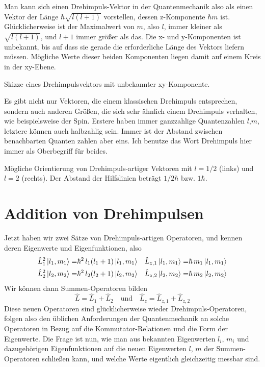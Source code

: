 Man kann sich einen Drehimpuls-Vektor in der Quantenmechanik also als einen Vektor der Länge $\hbar \sqrt{l (l+1)}$ vorstellen, dessen z-Komponente $\hbar m$ ist. Glücklicherweise ist der Maximalwert von $m$, also $l$, immer kleiner als $\sqrt{l (l+1)}$, und $l+1$ immer größer als das.
Die x- und y-Komponenten ist unbekannt, bis auf dass sie gerade die erforderliche Länge des Vektors liefern müssen. Mögliche Werte dieser beiden Komponenten liegen damit auf einem Kreis in der xy-Ebene.

\begin{marginfigure}
\caption{Skizze eines Drehimpulsvektors mit unbekannter xy-Komponente.}
\end{marginfigure}

Es gibt nicht nur Vektoren, die einem klassischen Drehimpuls entsprechen, sondern auch anderen Größen, die sich sehr ähnlich einem Drehimpuls verhalten, wie beispielsweise der Spin. Erstere haben immer ganzzahlige Quantenzahlen $l$,$m$, letztere können auch halbzahlig sein. Immer ist der Abstand zwischen benachbarten Quanten zahlen aber eins. Ich benutze das Wort Drehimpuls hier immer als Oberbegriff für beides.

\begin{marginfigure}

\caption{Mögliche Orientierung von  Drehimpuls-artiger Vektoren mit $l=1/2$ (links) und $l=2$ (rechts). Der Abstand der Hilfslinien beträgt $1/2 \hbar$ bzw. $1\hbar$.}
\end{marginfigure}

\section{Addition von Drehimpulsen}


Jetzt haben wir zwei Sätze von Drehimpuls-artigen Operatoren, und kennen deren Eigenwerte und Eigenfunktionen, also
\begin{align}
	\hat{L}^2_1 \ket{l_1, m_1}  = & \hbar^2 \, l_1 (l_1 +1 ) \ket{l_1, m_1} &
	\hat{L}_{z,1} \ket{l_1, m_1} = & \hbar \, m_1 \ket{l_1, m_1} \\
		\hat{L}^2_2 \ket{l_2, m_2}  = & \hbar^2 \, l_2 (l_2 +1 ) \ket{l_2, m_2} &
	\hat{L}_{z,2} \ket{l_2, m_2} = & \hbar \, m_2 \ket{l_2, m_2} 
\end{align}
Wir können dann Summen-Operatoren bilden
\begin{equation}
\hat{L} = \hat{L}_1 + \hat{L}_2 \quad \text{und} \quad\hat{L}_{z} = \hat{L}_{z,1} + \hat{L}_{z,2}
\end{equation}
Diese neuen Operatoren sind glücklicherweise wieder Drehimpuls-Operatoren, folgen also den üblichen Anforderungen der Quantenmechanik an solche Operatoren in Bezug auf die Kommutator-Relationen und die Form der Eigenwerte. Die Frage ist nun, wie man aus bekannten Eigenwerten $l_i$, $m_i$ und dazugehörigen Eigenfunktionen auf die neuen Eigenwerten $l$, $m$ der Summen-Operatoren schließen kann, und welche Werte eigentlich gleichzeitig messbar sind.

